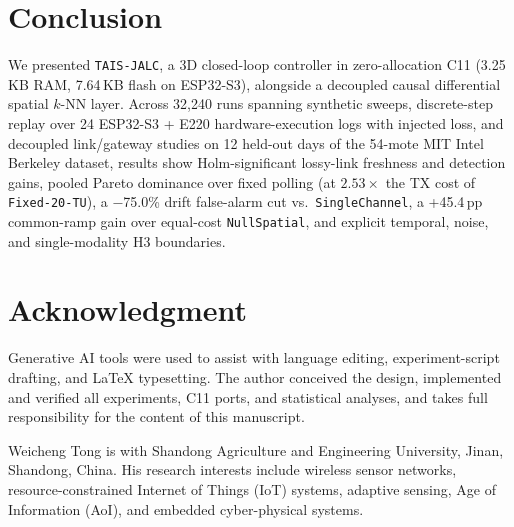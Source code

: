 \documentclass[journal,twoside,web]{ieeecolor}
\begin{document}
\section{Conclusion}
We presented \texttt{TAIS-JALC}, a 3D closed-loop controller in zero-allocation C11 (3.25\,KB RAM, 7.64\,KB flash on ESP32-S3), alongside a decoupled causal differential spatial $k$-NN layer. Across 32,240 runs spanning synthetic sweeps, discrete-step replay over 24 ESP32-S3 + E220 hardware-execution logs with injected loss, and decoupled link/gateway studies on 12 held-out days of the 54-mote MIT Intel Berkeley dataset, results show Holm-significant lossy-link freshness and detection gains, pooled Pareto dominance over fixed polling (at $2.53\times$ the TX cost of \texttt{Fixed-20-TU}), a $-$75.0\% drift false-alarm cut vs.\ \texttt{SingleChannel}, a +45.4\,pp common-ramp gain over equal-cost \texttt{NullSpatial}, and explicit temporal, noise, and single-modality H3 boundaries.

\section*{Acknowledgment}
Generative AI tools were used to assist with language editing, experiment-script drafting, and \LaTeX{} typesetting. The author conceived the design, implemented and verified all experiments, C11 ports, and statistical analyses, and takes full responsibility for the content of this manuscript.




\vspace{-3.3\baselineskip}
\begin{IEEEbiographynophoto}{Weicheng Tong}
is with Shandong Agriculture and Engineering University, Jinan, Shandong, China. His research interests include wireless sensor networks, resource-constrained Internet of Things (IoT) systems, adaptive sensing, Age of Information (AoI), and embedded cyber-physical systems.
\end{IEEEbiographynophoto}
\end{document}
